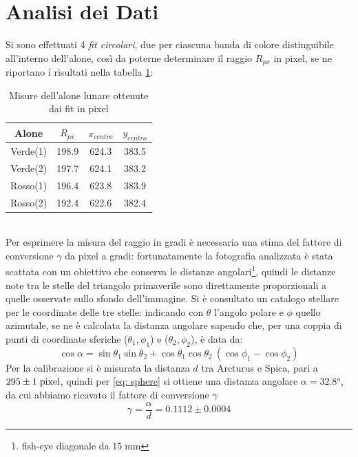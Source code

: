 \documentclass{report}[a4paper,11pt]
\begin{document}
\section{Analisi dei Dati}
Si sono effettuati 4 \emph{fit circolari}, due per ciascuna banda di colore distinguibile all'interno dell'alone, così da poterne determinare il raggio $R_{px}$ in pixel, se ne riportano i risultati nella tabella \ref{tab:halofit}:
\begin{table}[!htb]
  \begin{center}
	\begin{tabular}{cccc}
	\toprule
	Alone & $R_{px}$ & $x_{centro}$ & $y_{centro}$ \\
	\midrule
	\midrule
	Verde(1) & 198.9 & 624.3 & 383.5 \\ 
	Verde(2) & 197.7 & 624.1 & 383.2 \\ 
	Rosso(1) & 196.4 & 623.8 & 383.9 \\ 
	Rosso(2) & 192.4 & 622.6 & 382.4 \\ 
	\bottomrule
	\end{tabular}
  \end{center}
  \caption{Misure dell'alone lunare ottenute dai fit in pixel \label{tab:halofit}}
\end{table}\\
Per esprimere la misura del raggio in gradi è necessaria una stima del fattore di conversione $\gamma$ da pixel a gradi: fortunatamente la fotografia analizzata è stata scattata con un obiettivo che conserva le distanze angolari\footnote{fish-eye diagonale da $15 \; \si{\mm}$}, quindi le distanze note tra le stelle del triangolo primaverile sono direttamente proporzionali a quelle osservate sullo sfondo dell'immagine. Si è consultato un catalogo stellare \cite{stellarium} per le coordinate delle tre stelle: indicando con $\theta$ l'angolo polare e $\phi$ quello azimutale, se ne è calcolata la distanza angolare sapendo che, per una coppia di punti di coordinate sferiche ($\theta_1,\phi_1$) e ($\theta_2,\phi_2$), \`e data da:
\begin{equation}\label{eq: sphere}
\cos\alpha = \sin\theta_1\sin\theta_2 + \cos\theta_1\cos\theta_2 \: (\cos\phi_1 - \cos\phi_2)
\end{equation}
Per la calibrazione si è misurata la distanza $d$ tra Arcturus e Spica, pari a $295 \pm 1 \; \rm pixel$, quindi per \eqref{eq: sphere} si ottiene una distanza angolare $\alpha = 32.8 \si{\degree}$, da cui abbiamo ricavato il fattore di conversione $\gamma$
\begin{equation}\label{eq:conversion}
\gamma = \frac{\alpha}{d} = 0.1112 \pm 0.0004
\end{equation}
\end{document}
